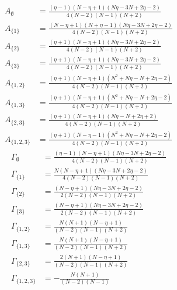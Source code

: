 \documentclass[11pt]{article}
\begin{document}
\begin{align*}
  A_{\emptyset} &= \frac{\left(\eta - 1\right) \left(N - \eta + 1\right) \left(N \eta - 3 N + 2 \eta - 2\right)}{4 \left(N - 2\right) \left(N - 1\right) \left(N + 2\right)} \\
  A_{\{1\}} &= \frac{\left(N - \eta + 1\right) \left(N + \eta - 1\right) \left(N \eta - 3 N + 2 \eta - 2\right)}{4 \left(N - 2\right) \left(N - 1\right) \left(N + 2\right)} \\
  A_{\{2\}} &= \frac{\left(\eta + 1\right) \left(N - \eta + 1\right) \left(N \eta - 3 N + 2 \eta - 2\right)}{4 \left(N - 2\right) \left(N - 1\right) \left(N + 2\right)} \\
  A_{\{3\}} &= \frac{\left(\eta + 1\right) \left(N - \eta + 1\right) \left(N \eta - 3 N + 2 \eta - 2\right)}{4 \left(N - 2\right) \left(N - 1\right) \left(N + 2\right)} \\
  A_{\{1,2\}} &= \frac{\left(\eta + 1\right) \left(N - \eta + 1\right) \left(N^{2} + N \eta - N + 2 \eta - 2\right)}{4 \left(N - 2\right) \left(N - 1\right) \left(N + 2\right)} \\
  A_{\{1,3\}} &= \frac{\left(\eta + 1\right) \left(N - \eta + 1\right) \left(N^{2} + N \eta - N + 2 \eta - 2\right)}{4 \left(N - 2\right) \left(N - 1\right) \left(N + 2\right)} \\
  A_{\{2,3\}} &= \frac{\left(\eta + 1\right) \left(N - \eta + 1\right) \left(N \eta - N + 2 \eta + 2\right)}{4 \left(N - 2\right) \left(N - 1\right) \left(N + 2\right)} \\
  A_{\{1,2,3\}} &= \frac{\left(\eta + 1\right) \left(N - \eta - 1\right) \left(N^{2} + N \eta - N + 2 \eta - 2\right)}{4 \left(N - 2\right) \left(N - 1\right) \left(N + 2\right)} 
\end{align*}
\begin{align*}
  \Gamma_{\emptyset} &= \frac{\left(\eta - 1\right) \left(N - \eta + 1\right) \left(N \eta - 3 N + 2 \eta - 2\right)}{4 \left(N - 2\right) \left(N - 1\right) \left(N + 2\right)} \\
  \Gamma_{\{1\}} &= \frac{N \left(N - \eta + 1\right) \left(N \eta - 3 N + 2 \eta - 2\right)}{4 \left(N - 2\right) \left(N - 1\right) \left(N + 2\right)} \\
  \Gamma_{\{2\}} &= \frac{\left(N - \eta + 1\right) \left(N \eta - 3 N + 2 \eta - 2\right)}{2 \left(N - 2\right) \left(N - 1\right) \left(N + 2\right)} \\
  \Gamma_{\{3\}} &= \frac{\left(N - \eta + 1\right) \left(N \eta - 3 N + 2 \eta - 2\right)}{2 \left(N - 2\right) \left(N - 1\right) \left(N + 2\right)} \\
  \Gamma_{\{1,2\}} &= \frac{N \left(N + 1\right) \left(N - \eta + 1\right)}{\left(N - 2\right) \left(N - 1\right) \left(N + 2\right)} \\
  \Gamma_{\{1,3\}} &= \frac{N \left(N + 1\right) \left(N - \eta + 1\right)}{\left(N - 2\right) \left(N - 1\right) \left(N + 2\right)} \\
  \Gamma_{\{2,3\}} &= \frac{2 \left(N + 1\right) \left(N - \eta + 1\right)}{\left(N - 2\right) \left(N - 1\right) \left(N + 2\right)} \\
  \Gamma_{\{1,2,3\}} &= - \frac{N \left(N + 1\right)}{\left(N - 2\right) \left(N - 1\right)} 
\end{align*}
\end{document}
